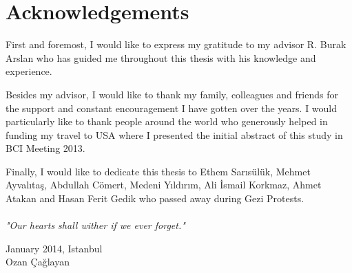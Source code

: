 \documentclass[12pt]{article}
\title{}
\renewcommand{\headrulewidth}{0pt}
\numberwithin{equation}{section}
\numberwithin{figure}{section}
\numberwithin{table}{section}
\begin{document}

%
%

\clearpage
\vspace*{-0.35cm}
\section*{Acknowledgements}
\vspace*{6pt}
\par{
    First and foremost, I would like to express my gratitude to my advisor
    R. Burak Arslan who has guided me throughout this thesis with
    his knowledge and experience.
}
\par{
    Besides my advisor, I would like to thank my family, colleagues and friends
    for the support and constant encouragement I have gotten over the years.
    I would particularly like to thank people around the world who generously helped
    in funding my travel to USA where I presented the initial abstract of this study
    in BCI Meeting 2013.
}
\par{
    Finally, I would like to dedicate this thesis to Ethem Sarısülük,
    Mehmet Ayvalıtaş, Abdullah Cömert, Medeni Yıldırım, Ali İsmail Korkmaz,
    Ahmet Atakan and Hasan Ferit Gedik who passed away during Gezi Protests.\\\\
    \emph{"Our hearts shall wither if we ever forget."}
}

\vspace*{2cm}
\begin{flushright}
January 2014, Istanbul \\
Ozan Çağlayan
\end{flushright}
\clearpage

\fancypagestyle{plain}{\fancyhf{}
  \renewcommand{\headrulewidth}{0pt}}
\setcounter{tocdepth}{5}
\renewcommand\contentsname{\normalsize\bfseries Table of Contents}
\thispagestyle{empty}
\vspace*{0.15cm}
\tableofcontents
\clearpage

\renewcommand\nomname{\normalsize\bfseries List of Abbreviations}
\thispagestyle{empty}
\vspace*{0.15cm}
\printnomenclature
\clearpage
\end{document}
